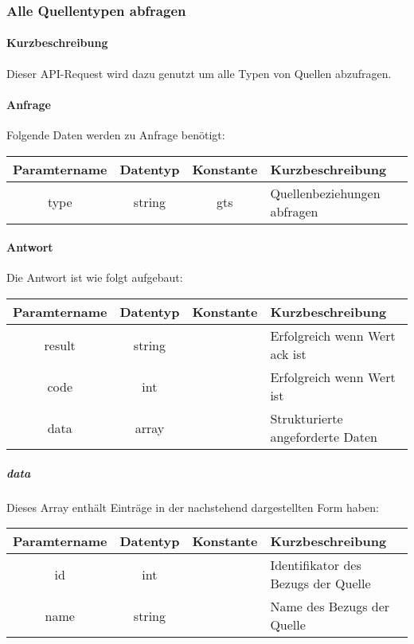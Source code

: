 \subsubsection{Alle Quellentypen abfragen}
\paragraph{Kurzbeschreibung}Dieser API-Request wird dazu genutzt um alle Typen von Quellen abzufragen.
\paragraph{Anfrage}Folgende Daten werden zu Anfrage benötigt:
\begin{table}[H]
	\begin{tabular}{|c|c|c|p{6.5cm}|}
		\hline
		\textbf{Paramtername} & \textbf{Datentyp} & \textbf{Konstante} & \textbf{Kurzbeschreibung}                                                                                               \\ \hline
		type                & string            & gts                & Quellenbeziehungen abfragen \\ \hline
	\end{tabular}
\end{table}
\paragraph{Antwort}Die Antwort ist wie folgt aufgebaut:
\begin{table}[H]
	\begin{tabular}{|c|c|c|p{6.5cm}|}
		\hline
		\textbf{Paramtername} & \textbf{Datentyp} & \textbf{Konstante} & \textbf{Kurzbeschreibung}                                                                                               \\ \hline
		result              & string           &                 & Erfolgreich wenn Wert {\glqq ack\grqq} ist \\ \hline
		code                & int              &                 & Erfolgreich wenn Wert {\glqq 0\grqq} ist \\ \hline
		data                & array            &                 & Strukturierte angeforderte Daten \\ \hline
	\end{tabular}
\end{table}
\subparagraph{data}Dieses Array enthält Einträge in der nachstehend dargestellten Form haben:
\begin{table}[H]
	\begin{tabular}{|c|c|c|p{6.5cm}|}
		\hline
		\textbf{Paramtername} & \textbf{Datentyp} & \textbf{Konstante} & \textbf{Kurzbeschreibung}    \\ \hline
		id         & int               &                 & Identifikator des Bezugs der Quelle \\ \hline
		name       & string            &                 & Name des Bezugs der Quelle \\ \hline
	\end{tabular}
\end{table}
